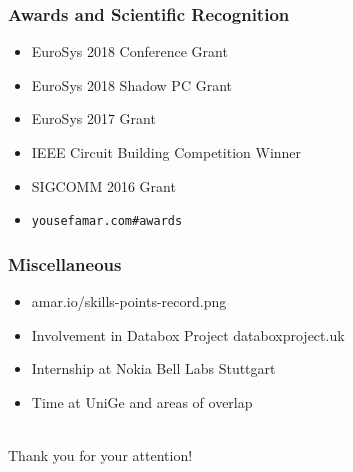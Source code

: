 \documentclass[aspectratio=169]{beamer}
\begin{document}
\begin{frame}
	\frametitle{Awards and Scientific Recognition}
	\begin{itemize}
		\item EuroSys 2018 Conference Grant
		\item EuroSys 2018 Shadow PC Grant
		\item EuroSys 2017 Grant
		\item IEEE Circuit Building Competition Winner
		\item SIGCOMM 2016 Grant
		\item \texttt{yousefamar.com\#awards}
	\end{itemize}
\end{frame}

\begin{frame}
	\frametitle{Miscellaneous}
	\begin{itemize}
		\item amar.io/skills-points-record.png
		\item Involvement in Databox Project databoxproject.uk
		\item Internship at Nokia Bell Labs Stuttgart
		\item Time at UniGe and areas of overlap
	\end{itemize}
\end{frame}

\begin{frame}[plain,c]
	\begin{center}
		\ \\[2em]
		\Huge Thank you for your attention!\\[1em]
	\end{center}
\end{frame}
\end{document}

